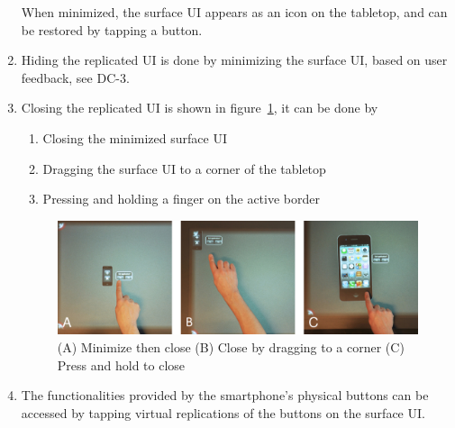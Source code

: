 \begin{enumerate}[{DD}-1]
When minimized, the surface UI appears as an icon on the tabletop, and can be restored by tapping a button.
\item Hiding the replicated UI is done by minimizing the surface UI, based on user feedback, see DC-3.
\item Closing the replicated UI is shown in figure~\ref{fig:sqClose}, it can be done by
	\begin{enumerate}[1{.}]
	\item Closing the minimized surface UI
	\item Dragging the surface UI to a corner of the tabletop
	\item Pressing and holding a finger on the active border
	\end{enumerate}

\begin{figure}[htb]
  \centering
    \includegraphics[width=0.7\linewidth]{images/sqClose}
  \caption{(A) Minimize then close (B) Close by dragging to a corner (C) Press and hold to close}
  \label{fig:sqClose}
\end{figure}

\item The functionalities provided by the smartphone's physical buttons can be accessed by tapping virtual replications of the buttons on the surface UI.
\end{enumerate}

\firmlists


